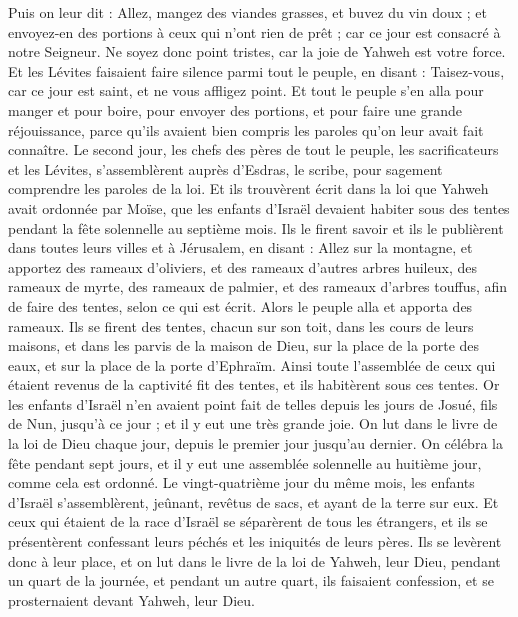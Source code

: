\begin{multicols}{2}
Puis on leur dit : Allez, mangez des viandes grasses, et buvez du vin doux ; et envoyez-en des portions à ceux qui n'ont rien de prêt ; car ce jour est consacré à notre Seigneur. Ne soyez donc point tristes, car la joie de Yahweh est votre force.
Et les Lévites faisaient faire silence parmi tout le peuple, en disant : Taisez-vous, car ce jour est saint, et ne vous affligez point.
Et tout le peuple s'en alla pour manger et pour boire, pour envoyer des portions, et pour faire une grande réjouissance, parce qu'ils avaient bien compris les paroles qu'on leur avait fait connaître.
Le second jour, les chefs des pères de tout le peuple, les sacrificateurs et les Lévites, s'assemblèrent auprès d’Esdras, le scribe, pour sagement comprendre les paroles de la loi.
Et ils trouvèrent écrit dans la loi que Yahweh avait ordonnée par Moïse, que les enfants d'Israël devaient habiter sous des tentes pendant la fête solennelle au septième mois.
Ils le firent savoir et ils le publièrent dans toutes leurs villes et à Jérusalem, en disant : Allez sur la montagne, et apportez des rameaux d'oliviers, et des rameaux d'autres arbres huileux, des rameaux de myrte, des rameaux de palmier, et des rameaux d’arbres touffus, afin de faire des tentes, selon ce qui est écrit.
Alors le peuple alla et apporta des rameaux. Ils se firent des tentes, chacun sur son toit, dans les cours de leurs maisons, et dans les parvis de la maison de Dieu, sur la place de la porte des eaux, et sur la place de la porte d'Ephraïm.
Ainsi toute l'assemblée de ceux qui étaient revenus de la captivité fit des tentes, et ils habitèrent sous ces tentes. Or les enfants d'Israël n'en avaient point fait de telles depuis les jours de Josué, fils de Nun, jusqu'à ce jour ; et il y eut une très grande joie.
On lut dans le livre de la loi de Dieu chaque jour, depuis le premier jour jusqu'au dernier. On célébra la fête pendant sept jours, et il y eut une assemblée solennelle au huitième jour, comme cela est ordonné.
\VerseOne{}Le vingt-quatrième jour du même mois, les enfants d'Israël s'assemblèrent, jeûnant, revêtus de sacs, et ayant de la terre sur eux.
Et ceux qui étaient de la race d'Israël se séparèrent de tous les étrangers, et ils se présentèrent confessant leurs péchés et les iniquités de leurs pères.
Ils se levèrent donc à leur place, et on lut dans le livre de la loi de Yahweh, leur Dieu, pendant un quart de la journée, et pendant un autre quart, ils faisaient confession, et se prosternaient devant Yahweh, leur Dieu.

\end{multicols}
